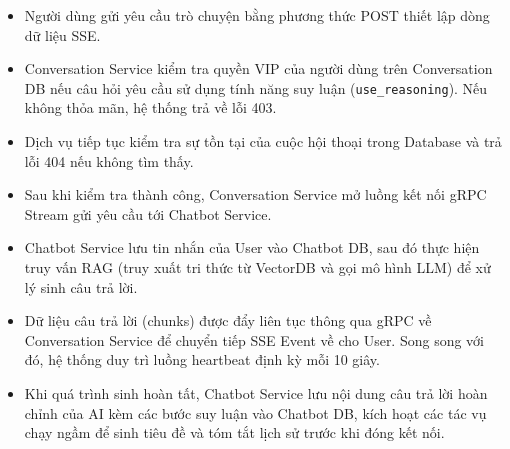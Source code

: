 \begin{itemize}
\item Người dùng gửi yêu cầu trò chuyện bằng phương thức POST thiết lập dòng dữ liệu SSE.
\item Conversation Service kiểm tra quyền VIP của người dùng trên Conversation DB nếu câu hỏi yêu cầu sử dụng tính năng suy luận (\texttt{use\_reasoning}). Nếu không thỏa mãn, hệ thống trả về lỗi 403.
\item Dịch vụ tiếp tục kiểm tra sự tồn tại của cuộc hội thoại trong Database và trả lỗi 404 nếu không tìm thấy.
\item Sau khi kiểm tra thành công, Conversation Service mở luồng kết nối gRPC Stream gửi yêu cầu tới Chatbot Service.
\item Chatbot Service lưu tin nhắn của User vào Chatbot DB, sau đó thực hiện truy vấn RAG (truy xuất tri thức từ VectorDB và gọi mô hình LLM) để xử lý sinh câu trả lời.
\item Dữ liệu câu trả lời (chunks) được đẩy liên tục thông qua gRPC về Conversation Service để chuyển tiếp SSE Event về cho User. Song song với đó, hệ thống duy trì luồng heartbeat định kỳ mỗi 10 giây.
\item Khi quá trình sinh hoàn tất, Chatbot Service lưu nội dung câu trả lời hoàn chỉnh của AI kèm các bước suy luận vào Chatbot DB, kích hoạt các tác vụ chạy ngầm để sinh tiêu đề và tóm tắt lịch sử trước khi đóng kết nối.
\end{itemize}
